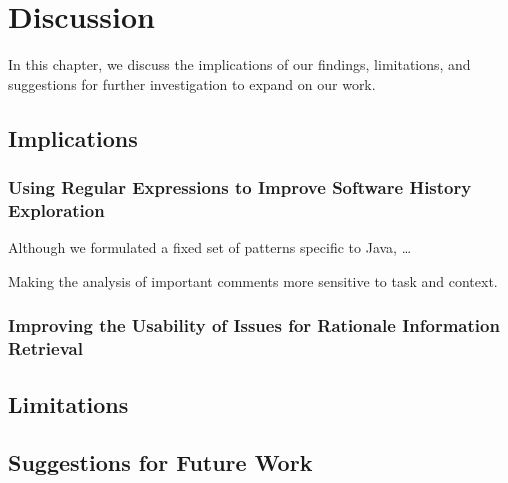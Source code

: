 \chapter{Discussion}
\label{ch:Discussion}

In this chapter, we discuss the implications of our findings, limitations, and suggestions for further investigation to expand on our work.


\section{Implications}

\subsection{Using Regular Expressions to Improve Software History Exploration}

Although we formulated a fixed set of patterns specific to Java, \dots {}

Making the analysis of important comments more sensitive to task and context.

\subsection{Improving the Usability of Issues for Rationale Information Retrieval}


\section{Limitations}


\section{Suggestions for Future Work}

\endinput

Any text after an \endinput is ignored.
You could put scraps here or things in progress.